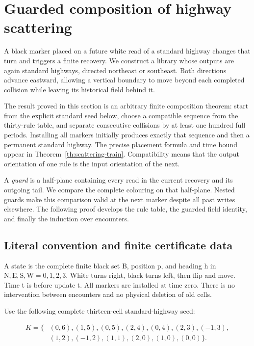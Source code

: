 \section{Guarded composition of highway
scattering}\label{guarded-composition-of-highway-scattering}

A black marker placed on a future white read of a standard highway changes
that turn and triggers a finite recovery. We construct a library whose outputs
are again standard highways, directed northeast or southeast. Both directions
advance eastward, allowing a vertical boundary to move beyond each completed
collision while leaving its historical field behind it.

The result proved in this section is an arbitrary finite composition theorem:
start from the explicit standard seed below, choose a compatible sequence from
the thirty-rule table, and separate consecutive collisions by at least one
hundred full periods. Installing all markers initially produces exactly that
sequence and then a permanent standard highway. The precise placement formula
and time bound appear in Theorem~\ref{th:scattering-train}. Compatibility means
that the output orientation of one rule is the input orientation of the next.

A \emph{guard} is a half-plane containing every read in the current recovery
and its outgoing tail. We compare the complete colouring on that half-plane.
Nested guards make this comparison valid at the next marker despite all past
writes elsewhere. The following proof develops the rule table, the guarded
field identity, and finally the induction over encounters.

\subsection{Literal convention and finite certificate
data}\label{scattering-2}

A state is the complete finite black set B, position p, and heading h in
$\mathrm N,\mathrm E,\mathrm S,\mathrm W=0,1,2,3$. White turns right, black turns left, then flip and
move. Time t is before update t. All markers are installed at time zero.
There is no intervention between encounters and no physical deletion of
old cells.

Use the following complete thirteen-cell standard-highway seed:

\[
\begin{aligned}K=\{&(0,6),(1,5),(0,5),(2,4),(0,4),(2,3),(-1,3),\\&(1,2),(-1,2),(1,1),(2,0),(1,0),(0,0)\}.\end{aligned}
\]

